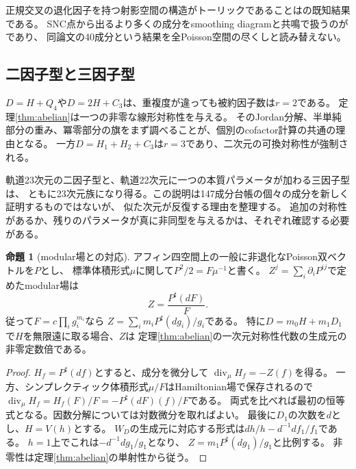 \documentclass[a4paper,11pt]{ltjsarticle}
\theoremstyle{definition}
\newtheorem{proposition}[theorem]{命題}
\theoremstyle{definition}\newtheorem{definition}[theorem]{定義}
\theoremstyle{remark}\newtheorem{remark}[theorem]{注意}
\newcommand{\diver}{\operatorname{div}}\newcommand{\Pf}{\operatorname{Pf}}
\begin{document}
正規交叉の退化因子を持つ射影空間の構造がトーリックであることは\cite[Proposition 5.16]{Pym}の既知結果である。
SNC点から出るより多くの成分をsmoothing diagramと共鳴で扱うのが\cite{MPS}であり、
同論文の40成分という結果を全Poisson空間の尽くしと読み替えない。

\subsection{二因子型と三因子型}
$D=H+Q_4$や$D=2H+C_3$は、重複度が違っても被約因子数は$r=2$である。
定理\ref{thm:abelian}は一つの非零な線形対称性を与える。
そのJordan分解、半単純部分の重み、冪零部分の旗をまず調べることが、個別のcofactor計算の共通の理由となる。
一方$D=H_1+H_2+C_3$は$r=3$であり、二次元の可換対称性が強制される。

軌道23次元の二因子型と、軌道22次元に一つの本質パラメータが加わる三因子型は、
ともに23次元族になり得る。この説明は147成分台帳の個々の成分を新しく証明するものではないが、
似た次元が反復する理由を整理する。
追加の対称性があるか、残りのパラメータが真に非同型を与えるかは、それぞれ確認する必要がある。


\begin{proposition}[modular場との対応]\label{prop:modular}
アフィン四空間上の一般に非退化なPoisson双ベクトルを$P$とし、
標準体積形式$\mu$に関して$P^2/2=F\mu^{-1}$と書く。
$Z^j=\sum_i\partial_iP^{ij}$で定めたmodular場は
\[
 Z=\frac{P^\sharp(dF)}{F}.
\]
従って$F=c\prod_i g_i^{m_i}$なら
$Z=\sum_i m_iP^\sharp(dg_i)/g_i$である。
特に$D=m_0H+m_1D_1$で$H$を無限遠に取る場合、$Z$は
定理\ref{thm:abelian}の一次元対称性代数の生成元の非零定数倍である。
\end{proposition}
\begin{proof}
$H_f=P^\sharp(df)$とすると、成分を微分して
$\diver_\mu H_f=-Z(f)$を得る。
一方、シンプレクティック体積形式$\mu/F$はHamiltonian場で保存されるので
$\diver_\mu H_f=H_f(F)/F=-P^\sharp(dF)(f)/F$である。
両式を比べれば最初の恒等式となる。因数分解については対数微分を取ればよい。
最後に$D_1$の次数を$d$とし、$H=V(h)$とする。
$W_D$の生成元に対応する形式は$dh/h-d^{-1}df_1/f_1$である。
$h=1$上でこれは$-d^{-1}dg_1/g_1$となり、
$Z=m_1P^\sharp(dg_1)/g_1$と比例する。
非零性は定理\ref{thm:abelian}の単射性から従う。
\end{proof}
\end{document}
